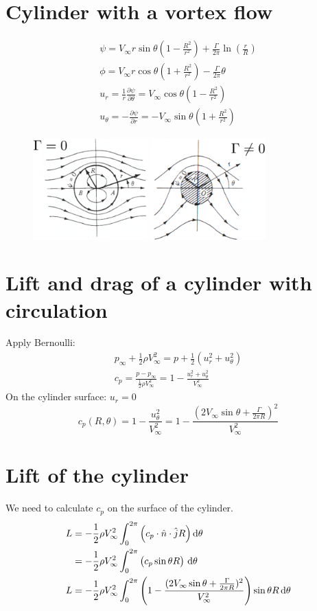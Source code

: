\documentclass[class=report, crop=false, 12pt,a4paper]{standalone}
\begin{document}
\section{Cylinder with a vortex flow}
\begin{gather}
  \psi = V_{\infty}r\sin\theta\left(1-\frac{R^2}{r^2}\right) + \frac{\Gamma}{2\pi}\ln\left(\frac{r}{R}\right)\\
  \phi = V_{\infty}r\cos\theta\left(1+\frac{R^2}{r^2}\right)-\frac{\Gamma}{2\pi}\theta\\
  u_r = \frac{1}{r}\frac{\partial \psi}{\partial \theta} = V_{\infty}\cos\theta\left(1-\frac{R^2}{r^2}\right)\\
  u_{\theta} = -\frac{\partial \psi}{\partial r} = - V_{\infty}\sin\theta\left(1+\frac{R^2}{r^2}\right)
\end{gather}
\begin{figure}[H]
  \centering
  \includegraphics[width = 0.8\textwidth]{../img/diagram25.png}
\end{figure}
\section{Lift and drag of a cylinder with circulation}
Apply Bernoulli:
\begin{gather}
  p_{\infty} + \frac{1}{2}\rho V_{\infty}^2 = p + \frac{1}{2}(u_r^2+u_{\theta}^2)\\
  c_p = \frac{p - p_{\infty}}{\frac{1}{2}\rho V_{\infty}^2} = 1 - \frac{u_r^2 + u_{\theta}^2}{V_{\infty}^2}
\end{gather}
On the cylinder surface: $u_r = 0$
\begin{equation}
  c_p (R,\theta) = 1 - \frac{u_{\theta}^2}{V_{\infty}^2}=1-\frac{(2V_{\infty}\sin\theta + \frac{\Gamma}{2\pi R})^2}{V_{\infty}^2}
\end{equation}
\section{Lift of the cylinder}
We need to calculate $c_p$ on the surface of the cylinder.
\begin{align}
  L &= -\frac{1}{2}\rho V_{\infty}^2\int_{0}^{2\pi} \left(c_p \cdot \hat{n}\cdot\hat{j}R\right)\dif \theta \\
  &= - \frac{1}{2}\rho V_{\infty}^2 \int_{0}^{2\pi} \left(c_p \sin\theta R\right) \,\mathrm{d}\theta \\
  L &= -\frac{1}{2}\rho V_{\infty}^2 \int_{0}^{2\pi} \left(1-\frac{(2V_{\infty}\sin\theta + \frac{\Gamma}{2\pi R})^2}{V_{\infty}^2}\right) \sin\theta R \,\mathrm{d}\theta 
\end{align}
\end{document}

